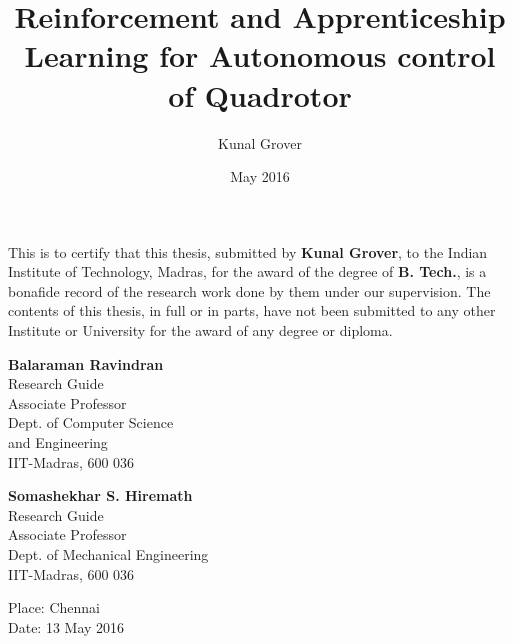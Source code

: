 \documentclass[hidelinks,BTech]{iitmdiss}
\begin{document}
\graphicspath{{images/}	}

\title{Reinforcement and Apprenticeship Learning for Autonomous control of Quadrotor}

\author{Kunal Grover}

\date{May 2016}

\maketitle

\certificate

\vspace*{0.5in}

\noindent This is to certify that this thesis, submitted by {\bf Kunal Grover}, to the Indian Institute of Technology, Madras, for the award of the degree of {\bf B. Tech.}, is a bonafide record of the research work done by them under our supervision. The contents of this thesis, in full or in parts, have not been submitted to any other Institute or University for the award of any degree or diploma.

\vspace*{1.5in}

\begin{singlespacing}

\begin{minipage}[t]{0.45\textwidth}
  {\bf Balaraman Ravindran} \\
  Research Guide \\
  Associate Professor \\
  Dept. of Computer Science \\
  and Engineering \\
  IIT-Madras, 600 036
\end{minipage}
\hfill
\begin{minipage}[t]{0.45\textwidth}
  {\bf Somashekhar S. Hiremath} \\
  Research Guide \\
  Associate Professor \\
  Dept. of Mechanical Engineering \\
  IIT-Madras, 600 036
\end{minipage}

\end{singlespacing}

\vspace*{0.25in}
\noindent Place: Chennai\\
Date: 13 May 2016
\end{document}
